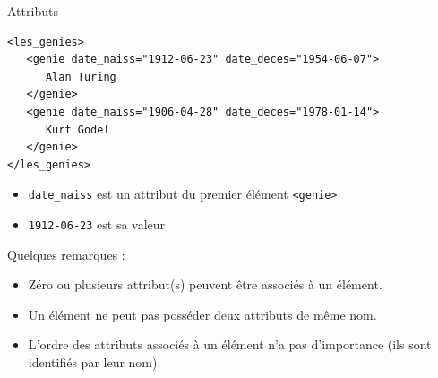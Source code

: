 \begin{frame}{Attributs}
\lstset{numbers=left, numberstyle=\tiny, stepnumber=1}

\begin{minipage}{0.8\textwidth}
\begin{lstlisting}
<les_genies>
   <genie date_naiss="1912-06-23" date_deces="1954-06-07">
      Alan Turing
   </genie>
   <genie date_naiss="1906-04-28" date_deces="1978-01-14">
      Kurt Godel
   </genie>
</les_genies>
\end{lstlisting}
\end{minipage}

\begin{itemize}
\item \verb?date_naiss? est un attribut du premier \'el\'ement \verb?<genie>?
\item \verb?1912-06-23? est sa valeur
\end{itemize}


\framebreak

Quelques remarques :
\begin{itemize}
\item Z\'ero ou plusieurs attribut(s) peuvent \^etre associ\'es \`a un \'el\'ement. 
\item Un \'el\'ement ne peut pas poss\'eder deux attributs de même nom. 
\item L'ordre des attributs associ\'es \`a un \'el\'ement n'a pas d'importance (ils sont identifi\'es par leur nom). 
\end{itemize}

\end{frame}



